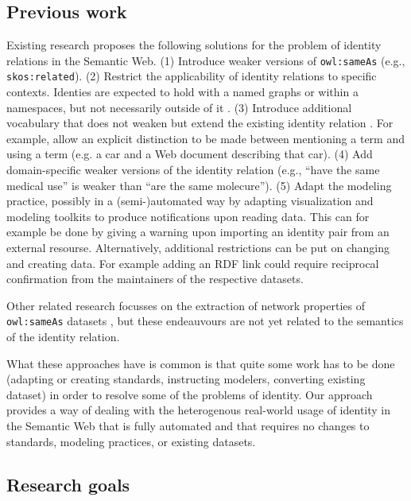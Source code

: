 \documentclass[letterpaper]{article}
\begin{document}
\subsection{Previous work}
\label{sec:previous_work}

Existing research proposes the following solutions for the problem of identity relations in the Semantic Web. (1) Introduce weaker versions of \verb|owl:sameAs| \cite{halpin_hayes_2010,mccusker_mcguinness_2010} (e.g., \verb|skos:related|). (2) Restrict the applicability of identity relations to specific contexts. Identies are expected to hold with a named graphs or within a namespaces, but not necessarily outside of it \cite{halpin_hayes_2010,melo_2013}. (3) Introduce additional vocabulary that does not weaken but extend the existing identity relation \cite{halpin_hayes_2010}. For example, allow an explicit distinction to be made between mentioning a term and using a term (e.g. a car and a Web document describing that car). (4) Add domain-specific weaker versions of the identity relation \cite{mccusker_mcguinness_2010} (e.g., ``have the same medical use'' is weaker than ``are the same molecure''). (5) Adapt the modeling practice, possibly in a (semi-)automated way by adapting visualization and modeling toolkits to produce notifications upon reading data. This can for example be done by giving a warning upon importing an identity pair from an external resourse. Alternatively, additional restrictions can be put on changing and creating data. For example adding an RDF link could require reciprocal confirmation from the maintainers of the respective datasets. \cite{halpin_hayes_2010,ding_shinavier_finin_mcguinness_2010}

Other related research focusses on the extraction of network properties of \verb|owl:sameAs| datasets \cite{ding_shinavier_shangguan_mcguinness_2010}, but these endeauvours are not yet related to the semantics of the identity relation.

What these approaches have is common is that quite some work has to be done (adapting or creating standards, instructing modelers, converting existing dataset) in order to resolve some of the problems of identity. Our approach provides a way of dealing with the heterogenous real-world usage of identity in the Semantic Web that is fully automated and that requires no changes to standards, modeling practices, or existing datasets.

\subsection{Research goals}
\label{sec:research_goals}
\end{document}
